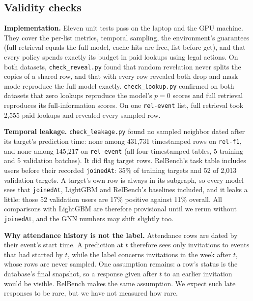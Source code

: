 \documentclass{article}
\begin{document}
\subsection{Validity checks}
\label{sec:validity}
\textbf{Implementation.} Eleven unit tests pass on the laptop and the GPU machine. They cover the per-list metrics, temporal sampling, the environment's guarantees (full retrieval equals the full model, cache hits are free, list before get), and that every policy spends exactly its budget in paid lookups using legal actions. On both datasets, \texttt{check\_reveal.py} found that random revelation never splits the copies of a shared row, and that with every row revealed both drop and mask mode reproduce the full model exactly. \texttt{check\_lookup.py} confirmed on both datasets that zero lookups reproduce the model's $p = 0$ scores and full retrieval reproduces its full-information scores. On one \texttt{rel-event} list, full retrieval took 2,555 paid lookups and revealed every sampled row.

\textbf{Temporal leakage.} \texttt{check\_leakage.py} found no sampled neighbor dated after its target's prediction time: none among 431,731 timestamped rows on \texttt{rel-f1}, and none among 145,217 on \texttt{rel-event} (all four timestamped tables, 5 training and 5 validation batches). It did flag target rows. RelBench's task table includes users before their recorded \texttt{joinedAt}: 35\% of training targets and 52 of 2,013 validation targets. A target's own row is always in its subgraph, so every model sees that \texttt{joinedAt}, LightGBM and RelBench's baselines included, and it leaks a little: those 52 validation users are 17\% positive against 11\% overall. All comparisons with LightGBM are therefore provisional until we rerun without \texttt{joinedAt}, and the GNN numbers may shift slightly too.

\textbf{Why attendance history is not the label.} Attendance rows are dated by their event's start time. A prediction at $t$ therefore sees only invitations to events that had started by $t$, while the label concerns invitations in the week after $t$, whose rows are never sampled. One assumption remains: a row's status is the database's final snapshot, so a response given after $t$ to an earlier invitation would be visible. RelBench makes the same assumption. We expect such late responses to be rare, but we have not measured how rare.
\end{document}
